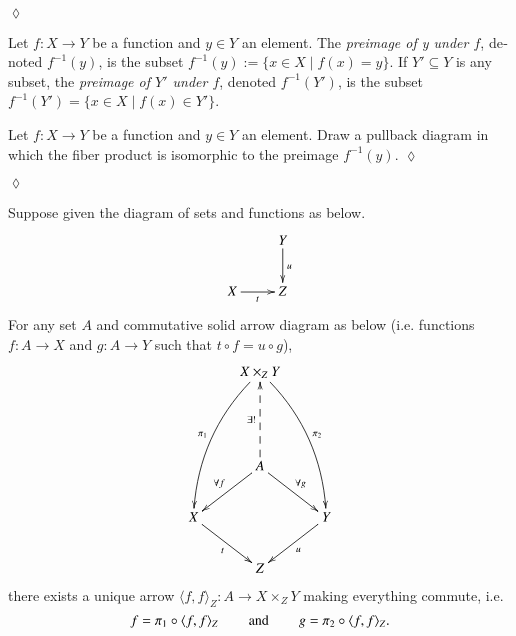 \documentclass[a4paper]{book}
\def\hsp{\hspace{.3in}}
\def\to{\rightarrow}
\def\taking{\colon}
\def\ss{\subseteq}
\def\|{{\;|\;}}
\def\m1{{-1}}
\def\la{\langle}
\def\ra{\rangle}
\newcommand{\prodmap}[2]{\la#1,#2\ra}
\newcommand{\pb}[3]{\prodmap{#1}{#1}_{#3}}
\theoremstyle{myth}
\newtheorem{lemmaENG}[envENG]{\begin{english}Lemma\end{english}}
\newtheorem{excENG}[envENG]{\begin{english}Exercise\end{english}}
\newtheorem{definitionENG}[envENG]{\begin{english}Definition\end{english}}
\newenvironment{exerciseENG}{\begin{excENG}}{\hspace*{\fill}$\lozenge$\end{excENG}}
\newtheorem{excRUS}[envRUS]{\begin{russian}Упражнение\end{russian}}
\newtheorem{definitionRUS}[envRUS]{\begin{russian}Определение\end{russian}}
\newenvironment{exerciseRUS}{\begin{excRUS}}{\hspace*{\fill}$\lozenge$\end{excRUS}}
\begin{document}
\begin{english}
\begin{exerciseRUS}~
\begin{russian} \end{russian}
\end{exerciseRUS}

\begin{definitionENG}[Preimage]\label{def:preimage}
Let $f\taking X\to Y$ be a function and $y\in Y$ an element. The {\em preimage of y under $f$}, denoted $f^\m1(y)$,\index{a symbol!$f^\m1$} is  the subset $f^\m1(y):=\{x\in X\|f(x)=y\}$. If $Y'\ss Y$ is any subset, the {\em preimage of $Y'$ under $f$}, denoted $f^\m1(Y')$, is the subset $f^\m1(Y')=\{x\in X\|f(x)\in Y'\}$.
\end{definitionENG}

\begin{definitionRUS}[Прообраз]\label{def:preimage}
\begin{russian} \end{russian}
\end{definitionRUS}

\begin{exerciseENG}
Let $f\taking X\to Y$ be a function and $y\in Y$ an element. Draw a pullback diagram in which the fiber product is isomorphic to the preimage $f^\m1(y)$.
\end{exerciseENG}

\begin{exerciseRUS}
\begin{russian} \end{russian}
\end{exerciseRUS}

\begin{lemmaENG}\label{lemma:up for fp}
Suppose given the diagram of sets and functions as below.
\begin{align*}
\xymatrix{&Y\ar[d]^u\\
X\ar[r]_t&Z}
\end{align*}
For any set $A$ and commutative solid arrow diagram as below (i.e. functions $f\taking A\to X$ and $g\taking A\to Y$ such that $t\circ f=u\circ g$), 
\begin{align}\label{dia:universal property of fp}
\xymatrix{
&X\times_ZY\ar@/_1pc/[lddd]_{\pi_1}\ar@/^1pc/[rddd]^{\pi_2}\\\\
&A\ar@{-->}[uu]^{\exists!}\ar[dl]_{\forall f}\ar[dr]^{\forall g}&\\
X\ar[rd]_t&&Y\ar[ld]^u\\
&Z&}
\end{align}
there exists a unique arrow $\pb{f}{g}{Z}\taking A\to X\times_ZY$ making everything commute, i.e. 
$$f=\pi_1\circ \pb{f}{g}{Z}\hsp\text{and}\hsp g=\pi_2\circ\pb{f}{g}{Z}.$$
\end{lemmaENG}


\end{english}
\end{document}
